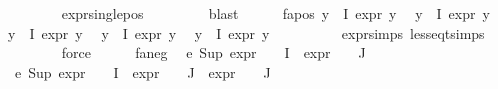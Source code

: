 \begin{isabellebody}
\ \ \ \ \ \ \isamarkupfalse%
\ expr{\isacharunderscore}{\kern0pt}single{\isacharunderscore}{\kern0pt}pos\ \isanewline
\ \ \ \ \ \ \isamarkupfalse%
\ blast\isanewline
\ \ \ \ \isamarkupfalse%
\ fa{\isacharunderscore}{\kern0pt}pos{\isacharcolon}{\kern0pt}\ {\isachardoublequoteopen}{\isasymforall}y{\isasymin}{\isasymPhi}\ {\isacharbackquote}{\kern0pt}\ I{\isachardot}{\kern0pt}\ expr{\isacharunderscore}{\kern0pt}{}\ y\ {\isasymle}\ {}{\isachardoublequoteclose}\isanewline
{\isachardoublequoteopen}{\isasymforall}y{\isasymin}{\isasymPhi}\ {\isacharbackquote}{\kern0pt}\ I{\isachardot}{\kern0pt}\ expr{\isacharunderscore}{\kern0pt}{}\ y\ {\isasymle}\ {}{\isachardoublequoteclose}\isanewline
{\isachardoublequoteopen}{\isasymforall}y{\isasymin}{\isasymPhi}\ {\isacharbackquote}{\kern0pt}\ I{\isachardot}{\kern0pt}\ expr{\isacharunderscore}{\kern0pt}{}\ y\ {\isasymle}\ {}{\isachardoublequoteclose}\isanewline
{\isachardoublequoteopen}{\isasymforall}y{\isasymin}{\isasymPhi}\ {\isacharbackquote}{\kern0pt}\ I{\isachardot}{\kern0pt}\ expr{\isacharunderscore}{\kern0pt}{}\ y\ {\isasymle}\ {}{\isachardoublequoteclose}\isanewline
{\isachardoublequoteopen}{\isasymforall}y{\isasymin}{\isasymPhi}\ {\isacharbackquote}{\kern0pt}\ I{\isachardot}{\kern0pt}\ expr{\isacharunderscore}{\kern0pt}{}\ y\ {\isasymle}\ {}{\isachardoublequoteclose}\isanewline
\ \ \ \ \ \ \isamarkupfalse%
\ expr{\isachardot}{\kern0pt}simps\ less{\isacharunderscore}{\kern0pt}eq{\isacharunderscore}{\kern0pt}t{\isachardot}{\kern0pt}simps\isanewline
\ \ \ \ \ \ \isamarkupfalse%
\ force{\isacharplus}{\kern0pt}\isanewline
\ \ \ \ \isamarkupfalse%
\ fa{\isacharunderscore}{\kern0pt}neg\ \isamarkupfalse%
\ e{}{\isacharcolon}{\kern0pt}\ {\isachardoublequoteopen}Sup\ {\isacharparenleft}{\kern0pt}{\isacharparenleft}{\kern0pt}expr{\isacharunderscore}{\kern0pt}{}\ {\isasymcirc}\ {\isasymPhi}{\isacharparenright}{\kern0pt}\ {\isacharbackquote}{\kern0pt}\ I\ {\isasymunion}\ {\isacharparenleft}{\kern0pt}expr{\isacharunderscore}{\kern0pt}{}\ {\isasymcirc}\ {\isasymPhi}{\isacharparenright}{\kern0pt}\ {\isacharbackquote}{\kern0pt}\ J{\isacharparenright}{\kern0pt}\ {\isasymle}\ {}{\isachardoublequoteclose}\isanewline
{}\ e{}{\isacharcolon}{\kern0pt}\ {\isachardoublequoteopen}{\isacharparenleft}{\kern0pt}Sup\ {\isacharparenleft}{\kern0pt}{\isacharparenleft}{\kern0pt}expr{\isacharunderscore}{\kern0pt}{}\ {\isasymcirc}\ {\isasymPhi}{\isacharparenright}{\kern0pt}\ {\isacharbackquote}{\kern0pt}\ I\ {\isasymunion}\ {\isacharparenleft}{\kern0pt}expr{\isacharunderscore}{\kern0pt}{}\ {\isasymcirc}\ {\isasymPhi}{\isacharparenright}{\kern0pt}\ {\isacharbackquote}{\kern0pt}\ J\ {\isasymunion}\ {\isacharparenleft}{\kern0pt}expr{\isacharunderscore}{\kern0pt}{}\ {\isasymcirc}\ {\isasymPhi}{\isacharparenright}{\kern0pt}\ {\isacharbackquote}{\kern0pt}\ J{\isacharparenright}{\kern0pt}{\isacharparenright}{\kern0pt}\ {\isasymle}\ {}{\isachardoublequoteclose}\isanewline

\end{isabellebody}
